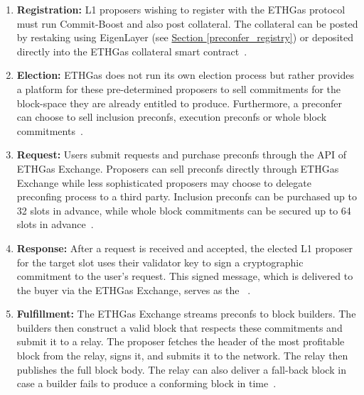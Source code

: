 \documentclass[a4paper]{article}
\theoremstyle{boldstyle}
\begin{document}
        
        \begin{enumerate}
            \item \textbf{Registration:}
            L1 proposers wishing to register with the ETHGas protocol must run Commit-Boost and also post collateral. The collateral can be posted by restaking using EigenLayer (see \hyperref[preconfer_registry]{Section \ref{preconfer_registry}}) or deposited directly into the ETHGas collateral smart contract~\cite{W:ETHGasDocs-Validators}.
            
            \item \textbf{Election:} 
            ETHGas does not run its own election process but rather provides a platform for these pre-determined proposers to sell commitments for the block-space they are already entitled to produce. Furthermore, a preconfer can choose to sell inclusion preconfs, execution preconfs or whole block commitments~\cite{W:IntroducingETHGasandRealtimeProposerCommitmentstotheLidoCommunity,W:ETHGasDocs-Overview}.
            
            \item \textbf{Request:}
            Users submit requests and purchase preconfs through the API of ETHGas Exchange.  Proposers can sell preconfs directly through ETHGas Exchange while less sophisticated proposers may choose to delegate preconfing process to a third party. Inclusion preconfs can be purchased up to 32 slots in advance, while whole block commitments can be secured up to 64 slots in advance~\cite{W:ETHGasDocs-CommitmentBuyers,W:IntroducingETHGasandRealtimeProposerCommitmentstotheLidoCommunity}.
                        
            \item \textbf{Response:}
            After a request is received and accepted, the elected L1 proposer for the target slot uses their validator key to sign a cryptographic commitment to the user's request. This signed message, which is delivered to the buyer via the ETHGas Exchange, serves as the ~\cite{W:IntroducingETHGasandRealtimeProposerCommitmentstotheLidoCommunity,W:ETHGasDocs-TheETHGasArchitecture}.
            
            \item \textbf{Fulfillment:}
            The ETHGas Exchange streams preconfs to block builders. The builders then construct a valid block that respects these commitments and submit it to a relay. The proposer fetches the header of the most profitable block from the relay, signs it, and submits it to the network. The relay then publishes the full block body. The relay can also deliver a fall-back block in case a builder fails to produce a conforming block in time~\cite{W:ETHGasDocs-BuildersSequencers,W:ETHGasDocs-Relays}.
            

\end{enumerate}
\end{document}
